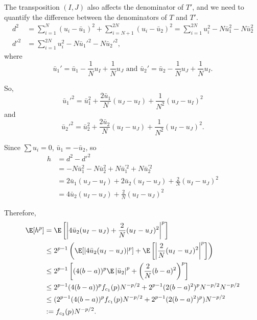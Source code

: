 The transposition $(I, J)$ also affects the denominator of $T'$, and we need to quantify the
difference between the denominators of $T$ and $T'$.  
\begin{align*}
    d^2 &= \sum_{i=1}^N (u_i - \bar{u}_1)^2 + \sum_{i=N+1}^{2N} (u_i -
    \bar{u}_2)^2 = \sum_{i=1}^{2N} u_i^2 - N \bar{u}_1^2 - N
    \bar{u}_2^2 \\
    d'^2 &= \sum_{i=1}^{2N} u_i^2 - N \bar{u}_1'^2 - N \bar{u}_2'^2,  
\end{align*}
where
\begin{equation*}
  \label{eq:6}
  \bar{u}_1' = \bar{u}_1 - \frac{1}{N}u_I + \frac{1}{N}u_J \text{ and }
  \bar{u}_2' = \bar{u}_2 - \frac{1}{N}u_J + \frac{1}{N}u_I.
\end{equation*}

So, 
\begin{equation*}
  \label{eq:7}
  \bar{u}_1'^2 = \bar{u}_1^2 + \frac{2\bar{u}_1}{N}(u_J-u_I) +
  \frac{1}{N^2}(u_J-u_I)^2
\end{equation*}
and
\begin{equation*}
  \label{eq:8}
  \bar{u}_2'^2 = \bar{u}_2^2 + \frac{2\bar{u}_2}{N}(u_I-u_J) +
  \frac{1}{N^2}(u_I-u_J)^2.
\end{equation*}

Since $\sum u_i = 0$, $\bar{u}_1 = -\bar{u}_2$, so
\begin{align*}
  h &= d^2-d'^2 \\
  &= -N \bar{u}_1^2 -N \bar{u}_2^2 + N\bar{u}_1^{'2} + N\bar{u}_2^{'2} \\
  &= 2\bar{u}_1(u_J-u_I) + 2\bar{u}_2(u_I-u_J)+\frac{2}{N}(u_I-u_J)^2 \\
  &= 4\bar{u}_2(u_I-u_J) + \frac{2}{N}(u_I-u_J)^2
\end{align*}

Therefore,
\begin{align}
  \E[h^p] &= \E \left [ \left | 4\bar{u}_2(u_I-u_J) +
      \frac{2}{N}(u_I-u_J)^2 \right |^p \right ] \nonumber \\
  &\leq 2^{p-1} \left ( \E[|4\bar{u}_2(u_I-u_J)|^p] 
    + \E \left [ \left |\frac{2}{N}(u_I-u_J)^2 \right |^p \right ]
  \right ) \nonumber \\
  &\leq 2^{p-1}\left [ (4(b-a))^p \E \left | \bar{u}_2 \right |^p
    + \left ( \frac{2}{N}(b-a)^2 \right )^p \right ] \nonumber \\
  &\leq 2^{p-1} (4(b-a))^p f_{c_1}(p)N^{-p/2} +
  2^{p-1}(2(b-a)^2)^pN^{-p/2}N^{-p/2} \nonumber \\
  &\leq (2^{p-1} (4(b-a))^p f_{c_1}(p)N^{-p/2} +
  2^{p-1}(2(b-a)^2)^p)N^{-p/2} \nonumber \\
  &:= f_{c_3}(p)N^{-p/2} \label{def:hp}.
\end{align}

